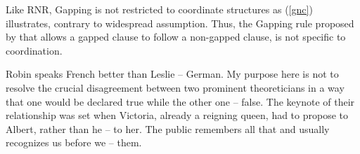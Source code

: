 \documentclass[output=paper
                ,modfonts
                ,nonflat
	        ,collection
	        ,collectionchapter
	        ,collectiontoclongg
 	        ,biblatex
                ,babelshorthands
                ,newtxmath
                ,draftmode
                ,colorlinks, citecolor=brown
]{./langsci/langscibook}
\begin{document}


Like RNR, Gapping is not restricted to coordinate structures as (\ref{gnc}) illustrates, contrary to
widespread assumption.   Thus, the Gapping rule proposed by \citet{sangheepark}  that allows a gapped clause to follow a non-gapped clause, is not specific to coordination. 

\begin{exe}
\ex 
\begin{xlista}
\ex Robin speaks French better than Leslie -- German.
\ex My purpose here is not to resolve the crucial disagreement between two prominent theoreticians in a way that one would be declared true while the other one -- false.
\ex The keynote of their relationship was set when Victoria, already a reigning queen,
had to propose to Albert, rather than he -- to her.
\ex The public remembers all that and usually recognizes us before we -- them.\\
\citep{sangheepark}
\end{xlista}\label{gnc}
\end{exe}
\end{document}
